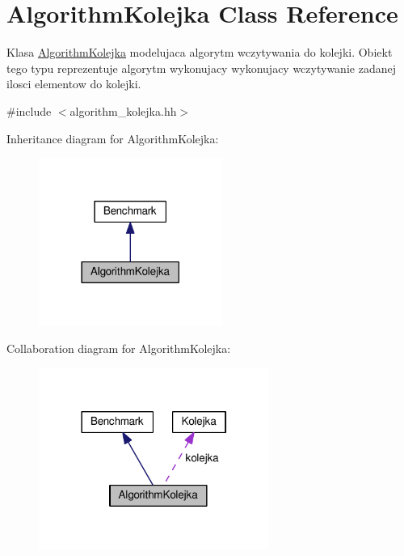 \hypertarget{class_algorithm_kolejka}{\section{Algorithm\-Kolejka Class Reference}
\label{class_algorithm_kolejka}
}


Klasa \hyperlink{class_algorithm_kolejka}{Algorithm\-Kolejka} modelujaca algorytm wczytywania do kolejki. Obiekt tego typu reprezentuje algorytm wykonujacy wykonujacy wczytywanie zadanej ilosci elementow do kolejki.  




{\ttfamily \#include $<$algorithm\-\_\-kolejka.\-hh$>$}



Inheritance diagram for Algorithm\-Kolejka\-:\nopagebreak
\begin{figure}[H]
\begin{center}
\leavevmode
\includegraphics[width=170pt]{class_algorithm_kolejka__inherit__graph}
\end{center}
\end{figure}


Collaboration diagram for Algorithm\-Kolejka\-:\nopagebreak
\begin{figure}[H]
\begin{center}
\leavevmode
\includegraphics[width=213pt]{class_algorithm_kolejka__coll__graph}
\end{center}
\end{figure}
